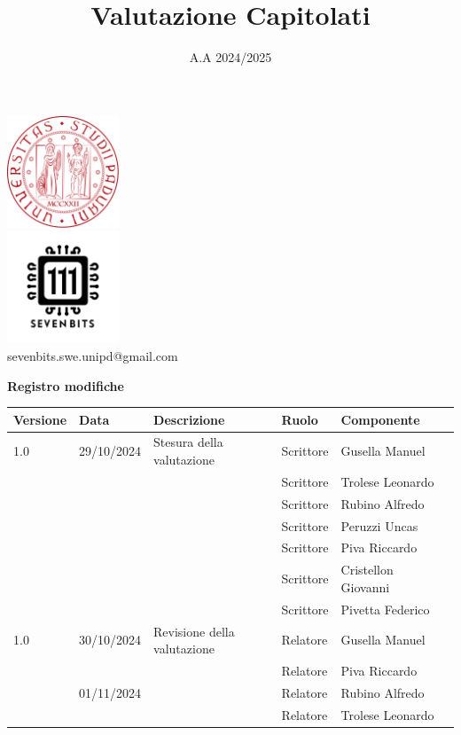 \documentclass[10pt]{article}
\title{Valutazione Capitolati}
\date{A.A 2024/2025}
\begin{document}
\maketitle
\begin{center}
\includegraphics[width=0.25\textwidth]{LogoUnipd.png}\\
\includegraphics[width=0.25\textwidth]{Sevenbitslogo.png}\\
sevenbits.swe.unipd@gmail.com\\
\vspace{2mm}

\textbf{Registro modifiche}\\
\vspace{2mm}
\begin{tabular}{|l|l|l|l|l|l|}
\hline
\textbf{Versione} & \textbf{Data} & \textbf{Descrizione} & \textbf{Ruolo} & \textbf{Componente} \\
\hline
1.0 & 29/10/2024 & Stesura della valutazione & Scrittore & Gusella Manuel\\
& & & Scrittore & Trolese Leonardo\\
& & & Scrittore & Rubino Alfredo\\
& & & Scrittore & Peruzzi Uncas\\
& & & Scrittore & Piva Riccardo\\
& & & Scrittore & Cristellon Giovanni\\
& & & Scrittore & Pivetta Federico\\
\hline
1.0 & 30/10/2024 & Revisione della valutazione & Relatore & Gusella Manuel\\
& & & Relatore & Piva Riccardo\\
& 01/11/2024 & & Relatore & Rubino Alfredo\\
& & & Relatore & Trolese Leonardo\\
\hline
\end{tabular}
\end{center}
\newpage
\tableofcontents
\newpage
\end{document}
